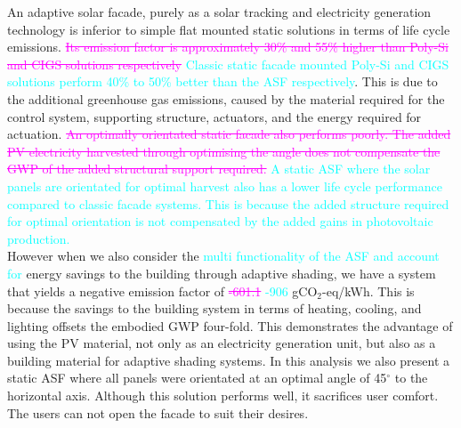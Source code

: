 
An adaptive solar facade, purely as a solar tracking and electricity generation technology is inferior to simple flat mounted static solutions in terms of life cycle emissions. \textcolor{magenta}{\sout{Its emission factor is approximately 30\% and 55\% higher than Poly-Si and CIGS solutions respectively}} \textcolor{cyan}{Classic static facade mounted Poly-Si and CIGS solutions perform 40\% to 50\% better than the ASF respectively}. This is due to the additional greenhouse gas emissions, caused by the material required for the control system, supporting structure, actuators, and the energy required for actuation. \textcolor{magenta}{\sout{An optimally orientated static facade also performs poorly. The added PV electricity harvested through optimising the angle does not compensate the GWP of the added structural support required.}} \textcolor{cyan}{A static ASF where the solar panels are orientated for optimal harvest also has a lower life cycle performance compared to classic facade systems. This is because the added structure required for optimal orientation is not compensated by the added gains in photovoltaic production.}\\

However when we also consider the \textcolor{cyan}{multi functionality of the ASF and account for} energy savings to the building through adaptive shading, we have a system that yields a negative emission factor of \textcolor{magenta}{\sout{ -601.1}} \textcolor{cyan}{-906} gCO$_{2}$-eq/kWh. This is because the savings to the building system in terms of heating, cooling, and lighting offsets the embodied GWP four-fold. This demonstrates the advantage of using the PV material, not only as an electricity generation unit, but also as a building material for adaptive shading systems. In this analysis we also present a static ASF where all panels were orientated at an optimal angle of 45$^{\circ}$ to the horizontal axis. Although this solution performs well, it sacrifices user comfort. The users can not open the facade to suit their desires.\\


